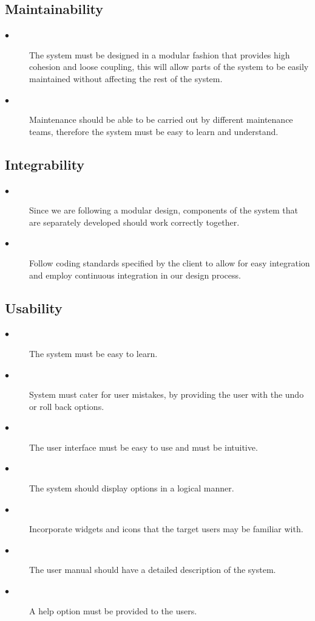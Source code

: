 \documentclass{article}
\begin{document}
    \subsection{Maintainability}
    
        \begin{description}
    
        \item[$\bullet$] The system must be designed in a modular fashion that provides high cohesion and loose coupling, this will allow parts of the system to be easily maintained without affecting the rest of the system.
        \item[$\bullet$]Maintenance should be able to be carried out by different maintenance teams, therefore the system must be easy to learn and understand.
        
        \end{description}
    
    \subsection{Integrability}
    
        \begin{description}
        
        \item[$\bullet$] Since we are following a modular design, components of the system that are separately developed should work correctly together.
        \item[$\bullet$] Follow coding standards specified by the client to allow for easy integration and employ continuous integration in our design process.
        
        \end{description}
    
    \subsection{Usability}
    
        \begin{description}
        
        \item[$\bullet$] The system must be easy to learn.
        \item[$\bullet$]System must cater for user mistakes, by providing the user with the undo or roll back options.
        \item[$\bullet$]The user interface must be easy to use and must be intuitive.
        \item[$\bullet$]The system should display options in a logical manner.
        \item[$\bullet$]Incorporate widgets and icons that the target users may be familiar with.
        \item[$\bullet$]The user manual should have a detailed description of the system.
        \item[$\bullet$]A help option must be provided to the users.
        
        \end{description}
    
\end{document}
